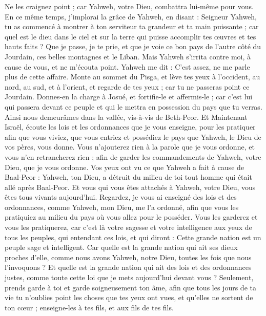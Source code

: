 \begin{multicols}{2}
Ne les craignez point ; car Yahweh, votre Dieu, combattra lui-même pour vous.
En ce même temps, j’implorai la grâce de Yahweh, en disant :
Seigneur Yahweh, tu as commencé à montrer à ton serviteur ta grandeur et ta main puissante ; car quel est le dieu dans le ciel et sur la terre qui puisse accomplir tes œuvres et tes hauts faits ?
Que je passe, je te prie, et que je voie ce bon pays de l’autre côté du Jourdain, ces belles montagnes et le Liban.
Mais Yahweh s’irrita contre moi, à cause de vous, et ne m'écouta point. Yahweh me dit : C'est assez, ne me parle plus de cette affaire.
Monte au sommet du Pisga, et lève tes yeux à l'occident, au nord, au sud, et à l'orient, et regarde de tes yeux ; car tu ne passeras point ce Jourdain.
Donnes-en la charge à Josué, et fortifie-le et affermis-le ; car c'est lui qui passera devant ce peuple et qui le mettra en possession du pays que tu verras.
Ainsi nous demeurâmes dans la vallée, vis-à-vis de Beth-Peor.
\VerseOne{}Et Maintenant Israël, écoute les lois et les ordonnances que je vous enseigne, pour les pratiquer afin que vous viviez, que vous entriez et possédiez le pays que Yahweh, le Dieu de vos pères, vous donne.
Vous n'ajouterez\FTNT{} rien à la parole que je vous ordonne, et vous n'en retrancherez rien ; afin de garder les commandements de Yahweh, votre Dieu, que je vous ordonne.
Vos yeux ont vu ce que Yahweh a fait à cause de Baal-Peor : Yahweh, ton Dieu, a détruit du milieu de toi tout homme qui était allé après Baal-Peor.
Et vous qui vous êtes attachés à Yahweh, votre Dieu, vous êtes tous vivants aujourd'hui.
Regardez, je vous ai enseigné des lois et des ordonnances, comme Yahweh, mon Dieu, me l'a ordonné, afin que vous les pratiquiez au milieu du pays où vous allez pour le posséder.
Vous les garderez et vous les pratiquerez, car c'est là votre sagesse et votre intelligence aux yeux de tous les peuples, qui entendant ces lois, et qui diront : Cette grande nation est un peuple sage et intelligent.
Car quelle est la grande nation qui ait ses dieux proches d’elle, comme nous avons Yahweh, notre Dieu, toutes les fois que nous l’invoquons ?
Et quelle est la grande nation qui ait des lois et des ordonnances justes, comme toute cette loi que je mets aujourd'hui devant vous ?
Seulement, prends garde à toi et garde soigneusement ton âme, afin que tous les jours de ta vie tu n'oublies point les choses que tes yeux ont vues, et qu’elles ne sortent de ton cœur ; enseigne-les à tes fils, et aux fils de tes fils.

\end{multicols}
